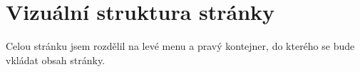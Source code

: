 \section{Vizuální struktura stránky}

Celou stránku jsem rozdělil na levé menu a pravý kontejner, do kterého se bude vkládat obsah stránky.


\newpage

\newpage